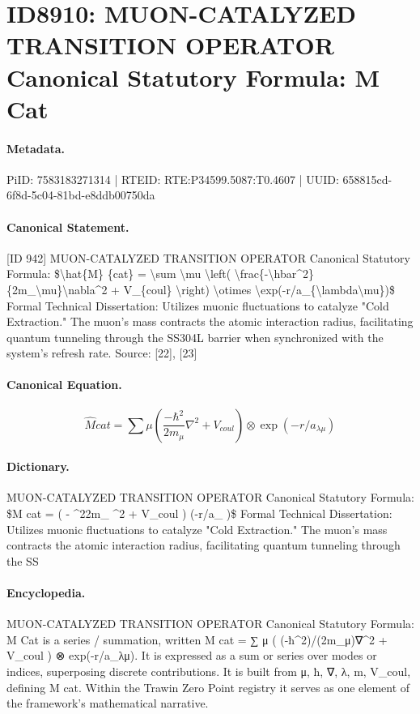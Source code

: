 \section*{ID8910: MUON-CATALYZED TRANSITION OPERATOR Canonical Statutory Formula: M Cat}
\paragraph{Metadata.}
PiID: 7583183271314 | RTEID: RTE:P34599.5087:T0.4607 | UUID: 658815cd-6f8d-5c04-81bd-e8ddb00750da

\paragraph{Canonical Statement.}
[ID 942] MUON-CATALYZED TRANSITION OPERATOR Canonical Statutory Formula: \$\textbackslash{}hat\{M\} \{cat\} = \textbackslash{}sum \textbackslash{}mu \textbackslash{}left( \textbackslash{}frac\{-\textbackslash{}hbar\textasciicircum{}2\}\{2m\_\textbackslash{}mu\}\textbackslash{}nabla\textasciicircum{}2 + V\_\{coul\} \textbackslash{}right) \textbackslash{}otimes \textbackslash{}exp(-r/a\_\{\textbackslash{}lambda\textbackslash{}mu\})\$ Formal Technical Dissertation: Utilizes muonic fluctuations to catalyze "Cold Extraction." The muon's mass contracts the atomic interaction radius, facilitating quantum tunneling through the SS304L barrier when synchronized with the system's refresh rate. Source: [22], [23]

\paragraph{Canonical Equation.}
\[
\hat{M} {cat} = \sum \mu \left( \frac{-\hbar^2}{2m_\mu}\nabla^2 + V_{coul} \right) \otimes \exp(-r/a_{\lambda\mu})
\]

\paragraph{Dictionary.}
MUON-CATALYZED TRANSITION OPERATOR Canonical Statutory Formula: \$M cat = ( - \textasciicircum{}22m\_ \textasciicircum{}2 + V\_coul ) (-r/a\_ )\$ Formal Technical Dissertation: Utilizes muonic fluctuations to catalyze "Cold Extraction." The muon's mass contracts the atomic interaction radius, facilitating quantum tunneling through the SS

\paragraph{Encyclopedia.}
MUON-CATALYZED TRANSITION OPERATOR Canonical Statutory Formula: M Cat is a series / summation, written M cat = ∑ μ ( (-ħ\textasciicircum{}2)/(2m\_μ)∇\textasciicircum{}2 + V\_coul ) ⊗ exp(-r/a\_λμ). It is expressed as a sum or series over modes or indices, superposing discrete contributions. It is built from μ, ħ, ∇, λ, m, V\_coul, defining M cat. Within the Trawin Zero Point registry it serves as one element of the framework's mathematical narrative.

